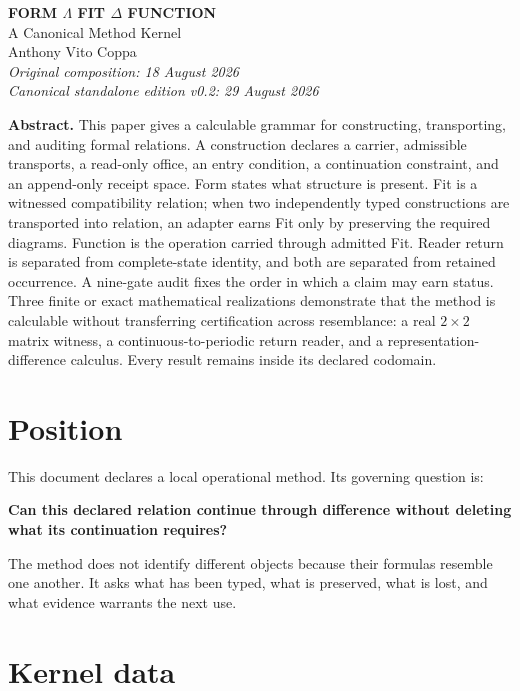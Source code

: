 \documentclass[11pt]{article}
\begin{document}
\begin{center}
{\Large\bfseries FORM $\Lambda$ FIT $\Delta$ FUNCTION}\\[3pt]
{\large A Canonical Method Kernel}\\[8pt]
Anthony Vito Coppa\\[2pt]
\textit{Original composition: 18 August 2026}\\
\textit{Canonical standalone edition v0.2: 29 August 2026}
\end{center}

\begin{lawbox}
\textbf{Abstract.}
This paper gives a calculable grammar for constructing, transporting, and auditing formal relations. A construction declares a carrier, admissible transports, a read-only office, an entry condition, a continuation constraint, and an append-only receipt space. Form states what structure is present. Fit is a witnessed compatibility relation; when two independently typed constructions are transported into relation, an adapter earns Fit only by preserving the required diagrams. Function is the operation carried through admitted Fit. Reader return is separated from complete-state identity, and both are separated from retained occurrence. A nine-gate audit fixes the order in which a claim may earn status. Three finite or exact mathematical realizations demonstrate that the method is calculable without transferring certification across resemblance: a real $2\times2$ matrix witness, a continuous-to-periodic return reader, and a representation-difference calculus. Every result remains inside its declared codomain.
\end{lawbox}

\section{Position}

This document declares a local operational method. Its governing question is:

\begin{lawbox}
\centering
\textbf{Can this declared relation continue through difference without deleting what its continuation requires?}
\end{lawbox}

The method does not identify different objects because their formulas resemble one another. It asks what has been typed, what is preserved, what is lost, and what evidence warrants the next use.

\section{Kernel data}
\end{document}
